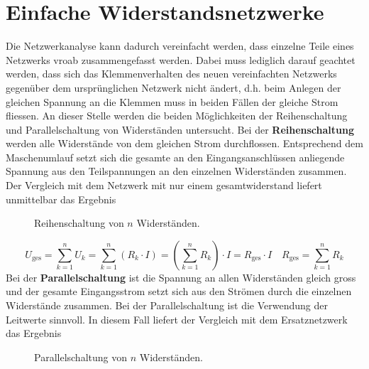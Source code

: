\section{Einfache Widerstandsnetzwerke}
Die Netzwerkanalyse kann dadurch vereinfacht werden, dass einzelne Teile eines Netzwerks vroab zusammengefasst werden. Dabei muss lediglich darauf geachtet werden, dass sich das Klemmenverhalten des neuen vereinfachten Netzwerks gegenüber dem ursprünglichen Netzwerk nicht ändert, d.h. beim Anlegen der gleichen Spannung an die Klemmen muss in beiden Fällen der gleiche Strom fliessen. An dieser Stelle werden die beiden Möglichkeiten der Reihenschaltung und Parallelschaltung von Widerständen untersucht. 
\newline\newline 
Bei der \textbf{Reihenschaltung} werden alle Widerstände von dem gleichen Strom durchflossen. Entsprechend dem Maschenumlauf setzt sich die gesamte an den Eingangsanschlüssen anliegende Spannung aus den Teilspannungen an den einzelnen Widerständen zusammen. Der Vergleich mit dem Netzwerk mit nur einem gesamtwiderstand liefert unmittelbar das Ergebnis
\begin{figure}[H]
\centering
\caption{Reihenschaltung von $n$ Widerständen.}
\label{fig_IIIk}
\end{figure}
\begin{equation}
\boxed{U_{\text{ges}}=\displaystyle \sum_{k=1}^{n}U_{k}=\displaystyle \sum_{k=1}^{n}\left(R_k\cdot I\right)=\left(\displaystyle \sum_{k=1}^{n}R_k\right)\cdot I =R_{\text{ges}}\cdot I}\quad \boxed{R_{\text{ges}}=\displaystyle \sum_{k=1}^nR_k}
\end{equation}
\noindent Bei der \textbf{Parallelschaltung} ist die Spannung an allen Widerständen gleich gross und der gesamte Eingangsstrom setzt sich aus den Strömen durch die einzelnen Widerstände zusammen. Bei der Parallelschaltung ist die Verwendung der Leitwerte sinnvoll. In diesem Fall liefert der Vergleich mit dem Ersatznetzwerk das Ergebnis
\begin{figure}[H]
\centering
\caption{Parallelschaltung von $n$ Widerständen.}
\label{fig_IIIl}
\end{figure}
